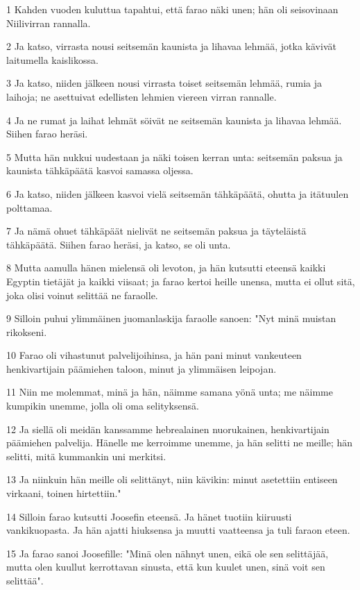 \par 1 Kahden vuoden kuluttua tapahtui, että farao näki unen; hän oli seisovinaan Niilivirran rannalla.
\par 2 Ja katso, virrasta nousi seitsemän kaunista ja lihavaa lehmää, jotka kävivät laitumella kaislikossa.
\par 3 Ja katso, niiden jälkeen nousi virrasta toiset seitsemän lehmää, rumia ja laihoja; ne asettuivat edellisten lehmien viereen virran rannalle.
\par 4 Ja ne rumat ja laihat lehmät söivät ne seitsemän kaunista ja lihavaa lehmää. Siihen farao heräsi.
\par 5 Mutta hän nukkui uudestaan ja näki toisen kerran unta: seitsemän paksua ja kaunista tähkäpäätä kasvoi samassa oljessa.
\par 6 Ja katso, niiden jälkeen kasvoi vielä seitsemän tähkäpäätä, ohutta ja itätuulen polttamaa.
\par 7 Ja nämä ohuet tähkäpäät nielivät ne seitsemän paksua ja täyteläistä tähkäpäätä. Siihen farao heräsi, ja katso, se oli unta.
\par 8 Mutta aamulla hänen mielensä oli levoton, ja hän kutsutti eteensä kaikki Egyptin tietäjät ja kaikki viisaat; ja farao kertoi heille unensa, mutta ei ollut sitä, joka olisi voinut selittää ne faraolle.
\par 9 Silloin puhui ylimmäinen juomanlaskija faraolle sanoen: "Nyt minä muistan rikokseni.
\par 10 Farao oli vihastunut palvelijoihinsa, ja hän pani minut vankeuteen henkivartijain päämiehen taloon, minut ja ylimmäisen leipojan.
\par 11 Niin me molemmat, minä ja hän, näimme samana yönä unta; me näimme kumpikin unemme, jolla oli oma selityksensä.
\par 12 Ja siellä oli meidän kanssamme hebrealainen nuorukainen, henkivartijain päämiehen palvelija. Hänelle me kerroimme unemme, ja hän selitti ne meille; hän selitti, mitä kummankin uni merkitsi.
\par 13 Ja niinkuin hän meille oli selittänyt, niin kävikin: minut asetettiin entiseen virkaani, toinen hirtettiin."
\par 14 Silloin farao kutsutti Joosefin eteensä. Ja hänet tuotiin kiiruusti vankikuopasta. Ja hän ajatti hiuksensa ja muutti vaatteensa ja tuli faraon eteen.
\par 15 Ja farao sanoi Joosefille: "Minä olen nähnyt unen, eikä ole sen selittäjää, mutta olen kuullut kerrottavan sinusta, että kun kuulet unen, sinä voit sen selittää".
